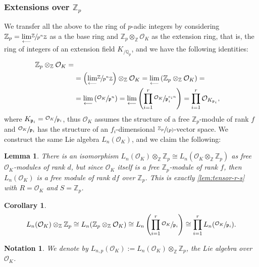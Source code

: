\documentclass{article}
\newtheorem{notation}[theorem]{Notation}
\newtheorem{lemma4}[paragraph]{Lemma}
\newtheorem{corollary4}[paragraph]{Corollary}
\begin{document}
\subsubsection{Extensions over $\mathbb{Z}_p$}
\label{zp-base-extension}
We transfer all the above to the ring of $p$-adic integers by considering $\mathbb{Z}_p=\underset{\longleftarrow}{\lim}\sfrac{\mathbb{Z}}{p^n\mathbb{Z}}$ as a the base ring and $\mathbb{Z}_p\otimes_\mathbb{Z}\mathcal{O}_K$ as the extension ring, that is, the ring of integers of an extension field $K_{/\mathbb{Q}_p}$, and we have the following identities:
\begin{align*}
\mathbb{Z}_p\otimes_\mathbb{Z}\mathcal{O}_K=\\
&=\left(\underset{\longleftarrow}{\lim}\sfrac{\mathbb{Z}}{p^n\mathbb{Z}}\right)\otimes_\mathbb{Z}\mathcal{O}_K=\underset{\longleftarrow}{\lim}\left(\mathbb{Z}_p\otimes_\mathbb{Z}\mathcal{O}_K\right)=\\
&=\underset{\longleftarrow}{\lim}\left(\sfrac{\mathcal{O}_K}{\mathfrak{p}^n}\right)=\underset{\longleftarrow}{\lim}\left(\prod_{i=1}^r\sfrac{\mathcal{O}_K}{\mathfrak{p}_i^{e_in}}\right)=\prod_{i=1}^r\mathcal{O}_{K_{\mathfrak{p}_i}},
\end{align*}
where $K_{\mathfrak{p}_i}=\sfrac{\mathcal{O}_K}{\mathfrak{p}_i}$, thus $\mathcal{O}_K$ assumes the structure of a free $\mathbb{Z}_p$-module of rank $f$
and $\sfrac{\mathcal{O}_K}{\mathfrak{p}_i}$ has the structure of an $f_i$-dimensional $\sfrac{\mathbb{Z}_p}{(p)}$-vector space.
We construct the same Lie algebra $L_n(\mathcal{O}_K)$, and we claim the following:
\begin{lemma4}
There is an isomorphism $L_n(\mathcal{O}_K)\otimes_\mathbb{Z}\mathbb{Z}_p\cong{L}_n(\mathcal{O}_K\otimes_\mathbb{Z}\mathbb{Z}_p)$ as free $\mathcal{O}_K$-modules of rank $d$, but since $\mathcal{O}_K$ itself is a free $\mathbb{Z}_p$-module of rank $f$, then $L_n(\mathcal{O}_K)$ is a free module of rank $df$ over $\mathbb{Z}_p$.
This is exactly \ref{lem:tensor-r-s} with $R=\mathcal{O}_K$ and $S=\mathbb{Z}_p$.
\end{lemma4}
\begin{corollary4}
\[
L_n(\mathcal{O}_K)\otimes_\mathbb{Z}\mathbb{Z}_p\cong{L}_n(\mathbb{Z}_p\otimes_\mathbb{Z}\mathcal{O}_K)\cong{L}_n\left(\prod_{i=1}^r\sfrac{\mathcal{O}_K}{\mathfrak{p}_i}\right)\cong\prod_{i=1}^r{L}_n(\sfrac{\mathcal{O}_K}{\mathfrak{p}_i}).\]
\end{corollary4}
\begin{notation}
We denote by $L_{n,p}(\mathcal{O}_K):=L_n(\mathcal{O}_K)\otimes_\mathbb{Z}\mathbb{Z}_p$, the Lie algebra over $\mathcal{O}_K$.
\end{notation}
\end{document}
